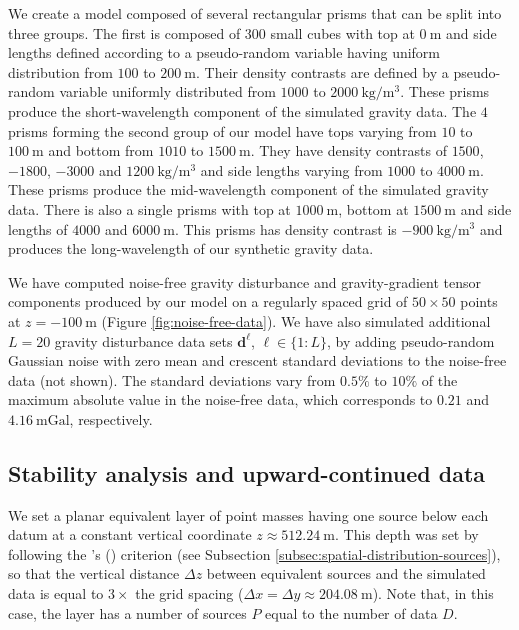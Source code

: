 We create a model composed of several rectangular prisms that can be split into three groups.
The first is composed of $300$ small cubes with top at $0 \: \mathrm{m}$ and side lengths
defined according to a pseudo-random variable having uniform distribution from 
$100$ to $200 \: \mathrm{m}$.
Their density contrasts are defined by a pseudo-random variable uniformly distributed
from $1000$ to $2000 \: \mathrm{kg / m^{3}}$.
These prisms produce the short-wavelength component of the simulated gravity data.
The $4$ prisms forming the second group of our model have tops varying from 
$10$ to $100 \: \mathrm{m}$ and bottom from $1010$ to $1500 \: \mathrm{m}$.
They have density contrasts of $1500$, $-1800$, $-3000$ and $1200  \: \mathrm{kg / m^{3}}$
and side lengths varying from $1000$ to $4000 \: \mathrm{m}$.
These prisms produce the mid-wavelength component of the simulated gravity data.
There is also a single prisms with top at $1000 \: \mathrm{m}$, bottom at 
$1500 \: \mathrm{m}$ and side lengths of $4000$ and $6000 \: \mathrm{m}$.
This prisms has density contrast is $-900 \: \mathrm{kg / m^{3}}$ and produces the
long-wavelength of our synthetic gravity data.

We have computed noise-free gravity disturbance and gravity-gradient tensor components 
produced by our model on a regularly spaced grid of $50 \times 50$ points at 
$z = -100 \: \mathrm{m}$ (Figure \ref{fig:noise-free-data}).
We have also simulated additional $L = 20$ gravity disturbance data sets $\mathbf{d}^{\ell}$, $\ell \in \{1:L\}$, 
by adding pseudo-random Gaussian noise with zero mean and crescent standard deviations to the noise-free data (not shown).
The standard deviations vary from $0.5\%$ to $10\%$ of the maximum absolute value in the noise-free data,
which corresponds to $0.21$ and $4.16 \: \mathrm{mGal}$, respectively.

\subsection{Stability analysis and upward-continued data}

We set a planar equivalent layer of point masses having one source below each datum at a constant vertical coordinate $z \approx 512.24 \: \mathrm{m}$.
This depth was set by following the \citeauthor{dampney1969}'s (\citeyear{dampney1969}) criterion (see Subsection \ref{subsec:spatial-distribution-sources}),
so that the vertical distance $\Delta z$ between equivalent sources and the simulated data is equal to $3 \times$ the grid spacing 
($\Delta x = \Delta y \approx 204.08 \: \mathrm{m} $).
Note that, in this case, the layer has a number of sources $P$ equal to the number of data $D$.

